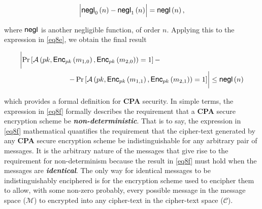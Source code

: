 \documentclass[../CryptoHW3.tex]{subfiles}
\begin{document}
\begin{flushleft}
\begin{align*}
  \Bigl| \text{{\fontfamily{phv}\selectfont negl}}_0 \left( n \right) - \text{{\fontfamily{phv}\selectfont negl}}_1 \left( n \right) \Bigr| = \text{{\fontfamily{phv}\selectfont negl}} \left( n \right),
\end{align*}

where $\text{{\fontfamily{phv}\selectfont negl}}$ is another negligible function, of order $n$.  Applying this to the expression in \ref{eq8e}, we obtain the final result

\begin{align}
  &\biggl| \Pr \left[ \mathcal{A} \left( pk,  \text{{\fontfamily{phv}\selectfont Enc}}_{pk} \left( m_{1, 0} \right), \text{{\fontfamily{phv}\selectfont Enc}}_{pk} \left( m_{2, 0} \right) \right) = 1 \right] - \biggr. \notag \\
  &\biggl. \qquad \qquad \qquad \quad - \Pr \left[ \mathcal{A} \left( pk,  \text{{\fontfamily{phv}\selectfont Enc}}_{pk} \left( m_{1, 1} \right), \text{{\fontfamily{phv}\selectfont Enc}}_{pk} \left( m_{2, 1} \right) \right) = 1 \right] \biggr| \leq \text{{\fontfamily{phv}\selectfont negl}} \left( n \right) \label{eq8f}
\end{align}

which provides a formal definition for \textbf{CPA} security.  In simple terms, the expression in \ref{eq8f} formally describes the requirement that a \textbf{CPA} secure encryption scheme be \textbf{\emph{non-deterministic}}. That is to say, the expression in \ref{eq8f} mathematical quantifies the requirement that the cipher-text generated by any \textbf{CPA} secure encryption scheme be indistinguishable for any arbitrary pair of messages.  It is the arbitrary nature of the messages that give rise to the requirement for non-determinism because the result in \ref{eq8f} must hold when the messages are \textbf{\emph{identical}}.  The only way for identical messages to be indistinguishably enciphered is for the encryption scheme used to encipher them to allow, with some non-zero probably, every possible message in the message space ($\mathcal{M}$) to encrypted into any cipher-text in the cipher-text space ($\mathcal{C}$).
























\end{flushleft}
\end{document}

